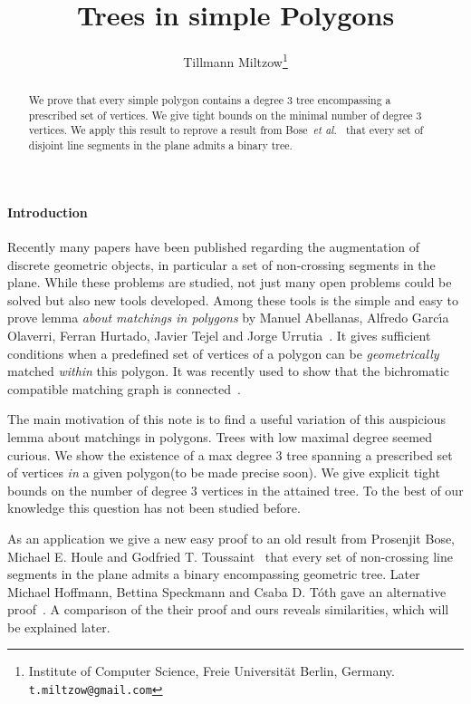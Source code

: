 \documentclass[12pt]{article}
\title{Trees in simple Polygons}
\author{ Tillmann Miltzow\footnote{Institute of Computer Science, Freie Universit\"at Berlin, Germany. \texttt{t.miltzow@gmail.com}}}
\date{}
\begin{document}
\maketitle


\begin{abstract} 
	We prove that every simple polygon contains a degree $3$ tree encompassing a prescribed set of vertices.
	We give tight bounds on the minimal number of degree $3$ vertices. We apply this result to reprove a result from Bose~\emph{et al.}~\cite{DBLP:journals/dcg/BoseHT01} that every set of disjoint line segments in the plane admits a binary tree.
\end{abstract}

\paragraph{Introduction}
Recently many papers have been published regarding the augmentation of discrete geometric objects, in particular a set of non-crossing segments in the plane. While these problems are studied, not just many open problems could be solved but also new tools developed. Among these tools is the simple and easy to prove lemma \emph{about matchings in polygons} by Manuel Abellanas, Alfredo Garc\'{\i}a Olaverri, Ferran Hurtado, Javier Tejel and Jorge Urrutia~\cite{DBLP:journals/comgeo/AbellanasOHTU08}. It gives sufficient conditions when a predefined set of vertices of a polygon can be \emph{geometrically} matched \emph{within} this polygon. 
It was recently used to show that the bichromatic compatible matching graph is connected~\cite{2012arXiv1207.2375A}.

The main motivation of this note is to find a useful variation of this auspicious lemma about matchings in polygons. Trees with low maximal degree seemed curious. We show the existence of a max degree $3$ tree spanning a prescribed set of vertices \emph{in} a given polygon(to be made precise soon). We give explicit tight bounds on the number of degree $3$ vertices in the attained tree. To the best of our knowledge this question has not been studied before.

As an application we give a new easy proof to an old result from Prosenjit Bose, Michael E. Houle and Godfried T. Toussaint~\cite{DBLP:journals/dcg/BoseHT01} that every set of non-crossing line segments in the plane admits a binary encompassing geometric tree.
Later Michael Hoffmann, Bettina Speckmann and Csaba D. T\'{o}th gave an alternative proof~\cite{Hoffmann201035}. A comparison of the their proof and ours reveals similarities, which will be explained later. 
\end{document}
